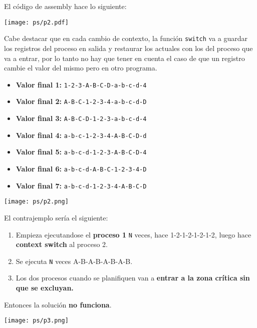 \documentclass[openany]{book}
\begin{document}
\begin{rta}
    El código de assembly hace lo siguiente:
    \begin{center}
        \texttt{[image: ps/p2.pdf]}    
    \end{center}
    Cabe destacar que en cada cambio de contexto, la función \texttt{switch} va a guardar los registros del proceso en salida y restaurar los actuales con los del proceso que va a entrar, por lo tanto no hay que tener en cuenta el caso de que un registro cambie el valor del mismo pero en otro programa.
    \begin{itemize}
        \item \textbf{Valor final 1:} \texttt{1-2-3-A-B-C-D-a-b-c-d-4}
        \item \textbf{Valor final 2:} \texttt{A-B-C-1-2-3-4-a-b-c-d-D}
        \item \textbf{Valor final 3:} \texttt{A-B-C-D-1-2-3-a-b-c-d-4}
        \item \textbf{Valor final 4:} \texttt{a-b-c-1-2-3-4-A-B-C-D-d}
        \item \textbf{Valor final 5:} \texttt{a-b-c-d-1-2-3-A-B-C-D-4}
        \item \textbf{Valor final 6:} \texttt{a-b-c-d-A-B-C-1-2-3-4-D}
        \item \textbf{Valor final 7:} \texttt{a-b-c-d-1-2-3-4-A-B-C-D}
    \end{itemize}
\end{rta}
\texttt{[image: ps/p2.png]}

\begin{rta}    
    El contrajemplo sería el siguiente:
    \begin{enumerate}
        \item Empieza ejecutandose el \textbf{proceso 1} \texttt{N} veces, hace 1-2-1-2-1-2-1-2, luego hace \textbf{context switch} al proceso 2.
        \item Se ejecuta \texttt{N} veces A-B-A-B-A-B-A-B.
        \item Los dos procesos cuando se planifiquen van a \textbf{entrar a la zona crítica sin que se excluyan.}
    \end{enumerate}
    Entonces la solución \textbf{no funciona}.
\end{rta}

\texttt{[image: ps/p3.png]}
\end{document}
